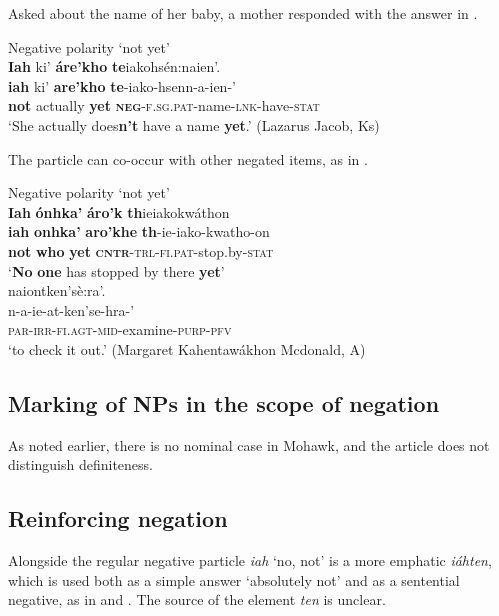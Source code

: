 \documentclass[output=paper,colorlinks,citecolor=brown]{langscibook}
\begin{document}
Asked about the name of her baby, a mother responded with the answer in .

\ea\label{ex:moh:94}Negative polarity ‘not yet’\\
    \glll \textbf{Iah} ki’ \textbf{áre’kho} \textbf{te}iakohsén:naien’. \\
         \textbf{iah} ki’ \textbf{are’kho} \textbf{te}-iako-hsenn-a-ien-’ \\
         \textbf{not} actually \textbf{yet} \textbf{\textsc{neg}}\textsc{-f.sg.pat}-name-\textsc{lnk-}have-\textsc{stat}\\
    \glt ‘She actually does\textbf{n’t} have a name \textbf{yet}.’ (Lazarus Jacob, Ks)
\z

The particle can co-occur with other negated items, as in .

\ea\label{ex:moh:95} Negative polarity ‘not yet’\\
    \glll \textbf{Iah} \textbf{ónhka’} \textbf{áro’k} \textbf{th}ieiakokwáthon  \\ 
          \textbf{iah} \textbf{onhka’} \textbf{aro’khe} \textbf{th}-ie-iako-kwatho-on \\ 
          \textbf{not} \textbf{who} \textbf{yet} \textsc{\textbf{cntr}-trl-fi.pat-}stop.by-\textsc{stat} \\
    \glt ‘\textbf{No} \textbf{one} has stopped by there \textbf{yet}’\\ \medskip
    \glll naiontken’sè:ra’.\\ 
          n-a-ie-at-ken’se-hra-’ \\
          \textsc{par-irr-fi.agt-mid}-examine-\textsc{purp-pfv}\\
    \glt  ‘to check it out.’ (Margaret Kahentawákhon Mcdonald, A)
\z 

\subsection{Marking of NPs in the scope of negation}

As noted earlier, there is no nominal case in Mohawk, and the article does not distinguish definiteness. 

\subsection{Reinforcing negation}

Alongside the regular negative particle \textit{iah} ‘no, not’ is a more emphatic \textit{iáhten}, which is used both as a simple answer ‘absolutely not’ and as a sentential negative, as in  and . The source of the element \textit{ten} is unclear.
\end{document}
